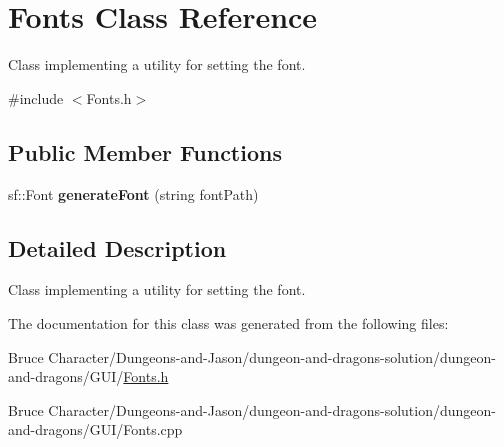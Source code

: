 \hypertarget{class_fonts}{}\section{Fonts Class Reference}
\label{class_fonts}


Class implementing a utility for setting the font.  




{\ttfamily \#include $<$Fonts.\+h$>$}

\subsection*{Public Member Functions}
\begin{DoxyCompactItemize}
\item 
\hypertarget{class_fonts_a0f9626637c82bd19377567c2e6d4f940}{}\label{class_fonts_a0f9626637c82bd19377567c2e6d4f940} 
sf\+::\+Font {\bfseries generate\+Font} (string font\+Path)
\end{DoxyCompactItemize}


\subsection{Detailed Description}
Class implementing a utility for setting the font. 

The documentation for this class was generated from the following files\+:\begin{DoxyCompactItemize}
\item 
Bruce Character/\+Dungeons-\/and-\/\+Jason/dungeon-\/and-\/dragons-\/solution/dungeon-\/and-\/dragons/\+G\+U\+I/\hyperlink{_fonts_8h}{Fonts.\+h}\item 
Bruce Character/\+Dungeons-\/and-\/\+Jason/dungeon-\/and-\/dragons-\/solution/dungeon-\/and-\/dragons/\+G\+U\+I/Fonts.\+cpp\end{DoxyCompactItemize}

